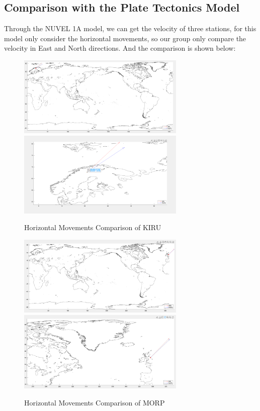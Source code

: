 \documentclass{article}
\begin{document}
\subsection{Comparison with the Plate Tectonics Model}
Through the NUVEL 1A model, we can get the velocity of three stations, for this model only consider the horizontal movements,
so our group only compare the velocity in East and North directions. And the comparison is shown below:
\begin{figure}[H]
  \centering
  {
  \includegraphics[width=8cm]{../result/KIRU/KIRU_4.jpg}}
  \hspace{3pt}    
  {
  \includegraphics[width=8cm]{../result/KIRU/KIRU_4(zoom_up).jpg}}
  \caption{Horizontal Movements Comparison of KIRU}
  \label{fig:Vel_KIRU}
  \end{figure}
  \begin{figure}[H]
    \centering
    {
    \includegraphics[width=8cm]{../result/MORP/MORP_4.jpg}}
    \hspace{3pt}    
    {
    \includegraphics[width=8cm]{../result/MORP/MORP_4(zoom_up).jpg}}
    \caption{Horizontal Movements Comparison of MORP}
    \label{fig:Vel_MORP}
  \end{figure}
\end{document}
